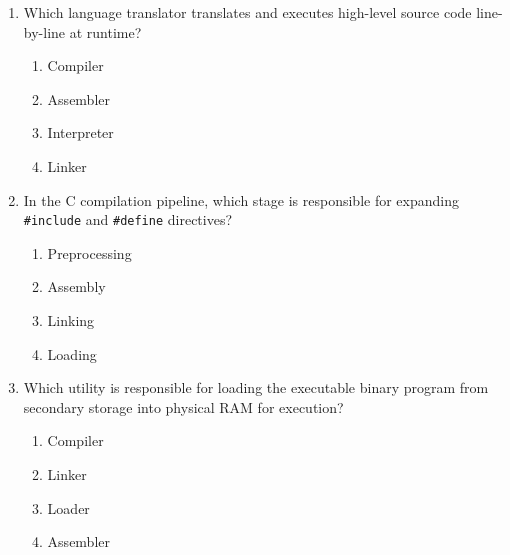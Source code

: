 \begin{enumerate}[leftmargin=1.5em]
    \item Which language translator translates and executes high-level source code line-by-line at runtime?
    \begin{enumerate}[label=(\alph*)]
        \item Compiler
        \item Assembler
        \item Interpreter
        \item Linker
    \end{enumerate}

    \item In the C compilation pipeline, which stage is responsible for expanding \texttt{\#include} and \texttt{\#define} directives?
    \begin{enumerate}[label=(\alph*)]
        \item Preprocessing
        \item Assembly
        \item Linking
        \item Loading
    \end{enumerate}

    \item Which utility is responsible for loading the executable binary program from secondary storage into physical RAM for execution?
    \begin{enumerate}[label=(\alph*)]
        \item Compiler
        \item Linker
        \item Loader
        \item Assembler
    \end{enumerate}
\end{enumerate}

